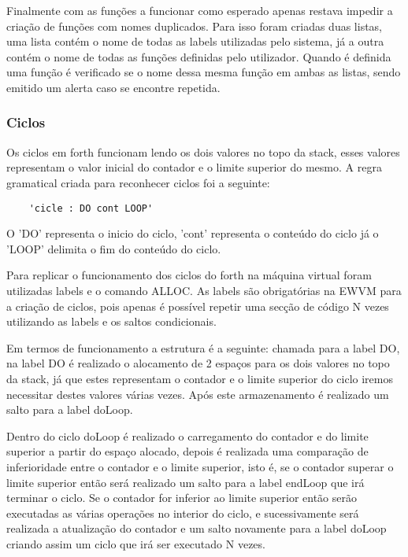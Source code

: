 \documentclass{article}
\begin{document}
Finalmente com as funções a funcionar como esperado apenas restava impedir a criação de funções com nomes duplicados. Para isso foram criadas duas listas, uma lista contém o nome de todas as labels utilizadas pelo sistema, já a outra contém o nome de todas as funções definidas pelo utilizador. Quando é definida uma função é verificado se o nome dessa mesma função em ambas as listas, sendo emitido um alerta caso se encontre repetida.






\subsubsection{Ciclos}
Os ciclos em forth funcionam lendo os dois valores no topo da stack, esses valores representam o valor inicial do contador e o limite superior do mesmo. A regra gramatical criada para reconhecer ciclos foi a seguinte:

\begin{verbatim}
    'cicle : DO cont LOOP'
\end{verbatim}

O 'DO' representa o inicio do ciclo, 'cont' representa o conteúdo do ciclo já o 'LOOP' delimita o fim do conteúdo do ciclo. 

Para replicar o funcionamento dos ciclos do forth na máquina virtual foram utilizadas labels e o comando ALLOC. As labels são obrigatórias na EWVM para a criação de ciclos, pois apenas é possível repetir uma secção de código N vezes utilizando as labels e os saltos condicionais.

Em termos de funcionamento a estrutura é a seguinte: chamada para a label DO, na label DO é realizado o alocamento de 2 espaços para os dois valores no topo da stack, já que estes representam o contador e o limite superior do ciclo iremos necessitar destes valores várias vezes. Após este armazenamento é realizado um salto para a label doLoop. 

Dentro do ciclo doLoop é realizado o carregamento do contador e do limite superior a partir do espaço alocado, depois é realizada uma comparação de inferioridade entre o contador e o limite superior, isto é, se o contador superar o limite superior então será realizado um salto para a label endLoop que irá terminar o ciclo. Se o contador for inferior ao limite superior então serão executadas as várias operações no interior do ciclo, e sucessivamente será realizada a atualização do contador e um salto novamente para a label doLoop criando assim um ciclo que irá ser executado N vezes.
\end{document}
